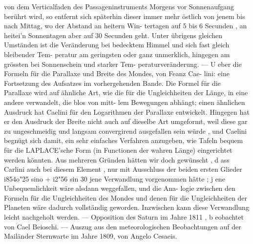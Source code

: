\documentclass[12pt,a4paper]{article}
\begin{document}
von dem Verticalfaden des Passageninstruments Morgens vor Sonnenaufgang berührt wird, so entfernt\newline
sich späterhin dieser immer mehr östlich von jenem bis nach Mittag, wo der Abstand an heitern Win-\newline
tertagen auf 5 bis 6 Secunden , an heitei'n Sonnentagen aber auf 30 Secunden geht. Unter übrigens\newline
gleichen Umständen ist die Veränderung bei bedecktem Himmel und sich fast gleich bleibender Tem-\newline
peratur am geringsten oder ganz unmerklich, hingegen am grössten bei Sonnenschein und starker Tem-\newline
peraturveränderung. --- U eber die Formeln für die Parallaxe und Breite des Mondes, von Feanz Cae-\newline
lini: eine Fortsetzung des Aufsatzes im vorhergehenden Bande. Die Formel für die Parallaxe wird auf\newline
ähnliche Art, wie die für die Ungleichheiten der Länge, in eine andere verwandelt, die blos von mitt-\newline
lem Bewegungen abhängt; einen ähnlichen Ausdruck hat Caelini für den Logarithmen der Parallaxe\newline
entwickelt. Hingegen hat er den Ausdruck der Breite nicht auch auf dieselbe Art umgeformt, weil\newline
diese gar zu ungeschmeidig und langsam convergirend ausgefallen sein würde , und Caelini begnügt\newline
sich damit, ein sehr einfaches Verfahren anzugeben, wie Tafeln bequem für die LAPLACE'sche Form (in\newline
Functionen der wahren Länge) eingerichtet werden könnten. Aus mehreren Gründen hätten wir doch\newline
gewünscht , d ass Carlini auch bei diesem Element , nur mit Ausschluss der beiden ersten Glieder\newline
i854o"25 sino + i2"56 sin 30\newline
jene Verwandlung vorgenommen hätte ; j ene Unbequemlichkeit wäre alsdann weggefallen, und die Ana-\newline
logie zwischen den Formeln für die Ungleichheiten des Mondes und denen für die Ungleichheiten der\newline
Planeten wäre dadurch vollständig geworden. Inzwischen kann diese Verwandlung leicht nachgeholt\newline
werden. --- Opposition des Saturn im Jahre 1811 , b eobachtet von Cael Beioschi. --- Auszug aus den\newline
meteorologischen Beobachtungen auf der Mailänder Sternwarte im Jahre 1809, von Angelo Cesaeis.\newline
\end{document}
